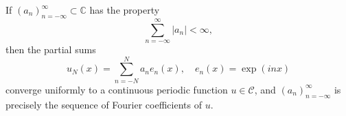 If $(a_n)_{n=-\infty}^{\infty} \subset \mathbb{C}$ has the property
$$\sum_{n=-\infty}^{\infty} |a_n| < \infty,$$
then the partial sums
$$u_N(x) = \sum_{n=-N}^{N} a_n e_n(x), \quad e_n(x) = \exp(inx)$$
converge uniformly to a continuous periodic function $u \in \mathcal{C}$, and $(a_n)_{n=-\infty}^{\infty}$ is precisely the sequence of Fourier coefficients of $u$.
